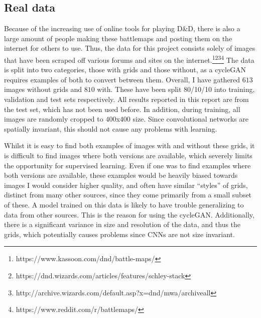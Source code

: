 \subsection{Real data}
Because of the increasing use of online tools for playing D\&D, there is also a large amount of people making these battlemaps and posting them on the internet for others to use. Thus, the data for this project consists solely of images that have been scraped off various forums and sites on the internet.\footnote{https://www.kassoon.com/dnd/battle-maps/}\footnote{https://dnd.wizards.com/articles/features/schley-stack}\footnote{http://archive.wizards.com/default.asp?x=dnd/mwa/archiveall}\footnote{https://www.reddit.com/r/battlemaps/} The data is split into two categories, those with grids and those without, as a cycleGAN requires examples of both to convert between them. Overall, I have gathered $613$ images without grids and $810$ with. These have been split 80/10/10 into training, validation and test sets respectively. All results reported in this report are from the test set, which has not been used before. In addition, during training, all images are randomly cropped to $400$x$400$ size. Since convolutional networks are spatially invariant, this should not cause any problems with learning.

Whilst it is easy to find both examples of images with and without these grids, it is difficult to find images where both versions are available, which severely limits the opportunity for supervised learning. Even if one was to find examples where both versions are available, these examples would be heavily biased towards images I would consider higher quality, and often have similar ``styles'' of grids, distinct from many other sources, since they come primarily from a small subset of these. A model trained on this data is likely to have trouble generalizing to data from other sources. This is the reason for using the cycleGAN. Additionally, there is a significant variance in size and resolution of the data, and thus the grids, which potentially causes problems since CNNs are not size invariant.

